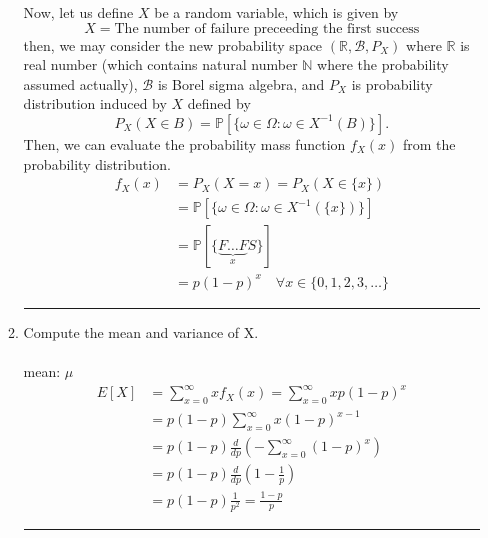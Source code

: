 \documentclass[twoside]{article}
\theoremstyle{definition}
\theoremstyle{remark}
\newenvironment{sol}{{\bf Solution:}}{\hfill\rule{2mm}{2mm}}
\begin{document}
\begin{enumerate}
\begin{enumerate}
\begin{sol}
      Now, let us define $X$ be a random variable, which is given by
      \begin{equation}
        X = \textrm{The number of failure preceeding the first success}
      \end{equation}
      then, we may consider the new probability space $(\mathbb{R}, \mathcal{B}, P_X)$
      where $\mathbb{R}$ is real number (which contains natural number $\mathbb{N}$
      where the probability assumed actually), $\mathcal{B}$ is Borel sigma algebra,
      and $P_X$ is probability distribution induced by $X$ defined by
      \begin{equation}
        P_X(X \in B) = \mathbb{P} [{\{\omega \in \Omega : \omega \in X^{-1}(B)\}}].
      \end{equation}
      Then, we can evaluate the probability mass function $f_X(x)$ from the
      probability distribution.
      \begin{equation}
        \begin{split}
          f_X(x)
          &= P_X(X = x) = P_X(X \in {\{x\}}) \\
          &= \mathbb{P}[{\{ \omega \in \Omega : \omega \in X^{-1}({\{x\}}) \}}] \\
          &= \mathbb{P}[{\{ \underbrace{F \ldots F}_x S \}}] \\
          &= p (1-p)^x \quad \forall x \in {\{0, 1, 2, 3, \ldots \}}
        \end{split}
      \end{equation}
    \end{sol}
    \item Compute the mean and variance of X.\\
    \begin{sol}\\
      mean: $\mu$
      \begin{equation}
        \begin{split}
          E[X]
          &= \sum_{x=0}^\infty x f_X(x) = \sum_{x=0}^\infty xp{(1-p)}^x \\
          &= p(1-p) \sum_{x=0}^\infty x{(1-p)}^{x-1} \\
          &= p(1-p) \frac{d}{dp}\left( - \sum_{x=0}^\infty {(1-p)}^x \right) \\
          &= p(1-p) \frac{d}{dp}\left( 1 - \frac{1}{p} \right) \\
          &= p(1-p) \frac{1}{p^2} = \frac{1-p}{p}
        \end{split}
      \end{equation}

\end{sol}
\end{enumerate}
\end{enumerate}
\end{document}
